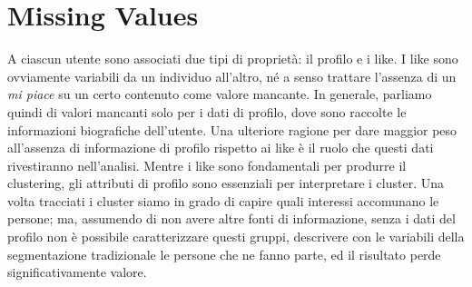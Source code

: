 \chapter{Missing Values}
\label{missing_values}
\thispagestyle{empty}

A ciascun utente sono associati due tipi di proprietà: il profilo e i like. I like sono ovviamente variabili da un individuo all'altro, né a senso trattare l'assenza di un \textit{mi piace} su un certo contenuto come valore mancante. In generale, parliamo quindi di valori mancanti solo per i dati di profilo, dove sono raccolte le informazioni biografiche dell'utente. Una ulteriore ragione per dare maggior peso all'assenza di informazione di profilo rispetto ai like è il ruolo che questi dati rivestiranno nell'analisi. Mentre i like sono fondamentali per produrre il clustering, gli attributi di profilo sono essenziali per interpretare i cluster. Una volta tracciati i cluster siamo in grado di capire quali interessi accomunano le persone; ma, assumendo di non avere altre fonti di informazione, senza i dati del profilo non è possibile caratterizzare questi gruppi, descrivere con le variabili della segmentazione tradizionale le persone che ne fanno parte, ed il risultato perde significativamente valore.\\
